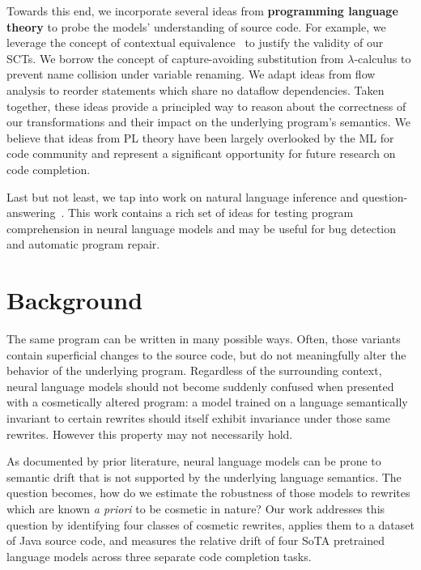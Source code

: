 \documentclass[usenames,dvipsnames]{article} %
\begin{document}
  Towards this end, we incorporate several ideas from \textbf{programming language theory} to probe the models' understanding of source code. For example, we leverage the concept of contextual equivalence~\citep{morris1969lambda} to justify the validity of our SCTs. We borrow the concept of capture-avoiding substitution from $\lambda$-calculus to prevent name collision under variable renaming. We adapt ideas from flow analysis to reorder statements which share no dataflow dependencies. Taken together, these ideas provide a principled way to reason about the correctness of our transformations and their impact on the underlying program's semantics. We believe that ideas from PL theory have been largely overlooked by the ML for code community and represent a significant opportunity for future research on code completion.

  Last but not least, we tap into work on natural language inference and question-answering~\citep{liu2021codeqa}. This work contains a rich set of ideas for testing program comprehension in neural language models and may be useful for bug detection and automatic program repair.

  \pagebreak\section{Background}\label{sec:background}

  The same program can be written in many possible ways. Often, those variants contain superficial changes to the source code, but do not meaningfully alter the behavior of the underlying program. Regardless of the surrounding context, neural language models should not become suddenly confused when presented with a cosmetically altered program: a model trained on a language semantically invariant to certain rewrites should itself exhibit invariance under those same rewrites. However this property may not necessarily hold.

  As documented by prior literature, neural language models can be prone to semantic drift that is not supported by the underlying language semantics. The question becomes, how do we estimate the robustness of those models to rewrites which are known \textit{a priori} to be cosmetic in nature? Our work addresses this question by identifying four classes of cosmetic rewrites, applies them to a dataset of Java source code, and measures the relative drift of four SoTA pretrained language models across three separate code completion tasks.
\end{document}
